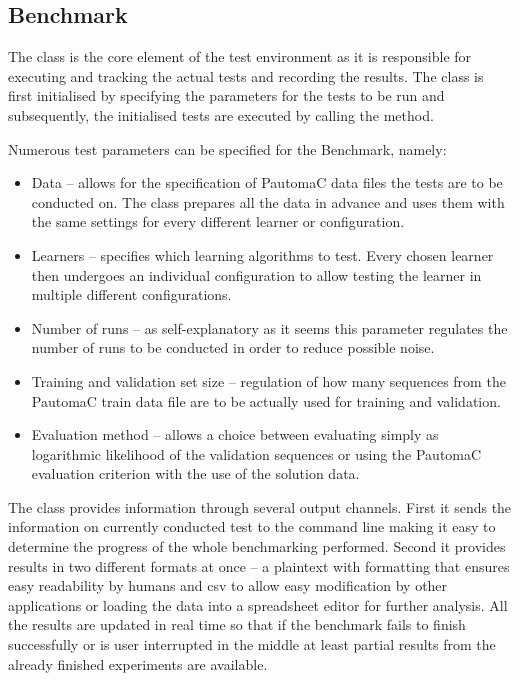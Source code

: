 \subsection{Benchmark}
The  class is the core element of the test environment as it is responsible for executing and tracking the actual tests and recording the results. The  class is first initialised by specifying the parameters for the tests to be run and subsequently, the initialised tests are executed by calling the  method.

Numerous test parameters can be specified for the Benchmark, namely:

\begin{itemize}
	\item[] Data -- allows for the specification of PautomaC data files the tests are to be conducted on. The  class prepares all the data in advance and uses them with the same settings for every different learner or configuration.
	\item[] Learners -- specifies which learning algorithms to test. Every chosen learner then undergoes an individual configuration to allow testing the learner in multiple different configurations.
	\item[] Number of runs -- as self-explanatory as it seems this parameter regulates the number of runs to be conducted in order to reduce possible noise.
	\item[] Training and validation set size -- regulation of how many sequences from the PautomaC train data file are to be actually used for training and validation.
	\item[] Evaluation method -- allows a choice between evaluating simply as logarithmic likelihood of the validation sequences or using the PautomaC evaluation criterion with the use of the solution data.
\end{itemize}

The  class provides information through several output channels. First it sends the information on currently conducted test to the command line making it easy to determine the progress of the whole benchmarking performed. Second it provides results in two different formats at once -- a plaintext with formatting that ensures easy readability by humans and \gls{csv} to allow easy modification by other applications or loading the data into a spreadsheet editor for further analysis. All the results are updated in real time so that if the benchmark fails to finish successfully or is user interrupted in the middle at least partial results from the already finished experiments are available.

